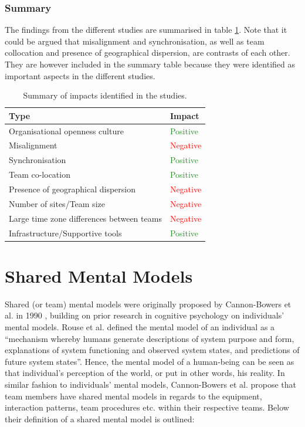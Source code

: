 \subsubsection{Summary}

The findings from the different studies are summarised in table \ref{summary}. Note that it could be argued that misalignment and synchronisation, as well as team collocation and presence of geographical dispersion, are contrasts of each other. They are however included in the summary table because they were identified as important aspects in the different studies.

\begin{table}[H]
\begin{center}
    \begin{tabular}{ | p{7.25cm} | p{4.25cm} |}
    \hline
    \textbf{Type} & \textbf{Impact} \\ \hline
    Organisational openness culture & \textcolor{ForestGreen}{Positive} \\ \hline
    Misalignment & \textcolor{red}{Negative} \\ \hline
    Synchronisation & \textcolor{ForestGreen}{Positive} \\ \hline
    Team co-location & \textcolor{ForestGreen}{Positive} \\ \hline
    Presence of geographical dispersion & \textcolor{red}{Negative} \\ \hline
    Number of sites/Team size & \textcolor{red}{Negative} \\ \hline
    Large time zone differences between teams & \textcolor{red}{Negative} \\ \hline
    Infrastructure/Supportive tools & \textcolor{ForestGreen}{Positive} \\ \hline
    \end{tabular}
    \caption{Summary of impacts identified in the studies.}
    \label{summary}
\end{center}
\end{table}

\section{Shared Mental Models}

Shared (or team) mental models were originally proposed by Cannon-Bowers et al. in 1990 \cite{Cannon1990}, building on prior research in cognitive psychology on individuals’ mental models. Rouse et al. \cite{Rouse1986} defined the mental model of an individual as a ``mechanism whereby humans generate descriptions of system purpose and form, explanations of system functioning and observed system states, and predictions of future system states''. Hence, the mental model of a human-being can be seen as that individual's perception of the world, or put in other words, his reality. In similar fashion to individuals' mental models, Cannon-Bowers et al. propose that team members have shared mental models in regards to the equipment, interaction patterns, team procedures etc. within their respective teams. Below their definition of a shared mental model is outlined:

